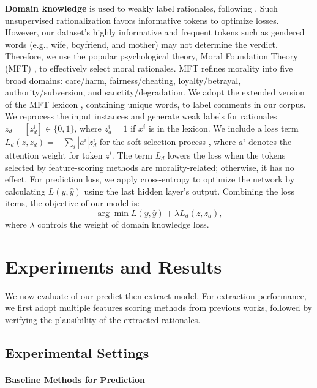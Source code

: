 \documentclass[letterpaper]{article} %
\begin{document}
\textbf{Domain knowledge} is used to weakly label rationales, following \citep{jiang-2021-structurizing}. 
Such unsupervised rationalization favors informative tokens to optimize losses. 
However, our dataset's highly informative and frequent tokens such as gendered words (e.g., wife, boyfriend, and mother) may not determine the verdict.
Therefore, we use the popular \cite{nguyen-2022-mapping, ziems-2022-moral} psychological theory, Moral Foundation Theory (MFT) \cite{haidt-2007-mft}, to effectively select moral rationales.
MFT refines morality into five broad domains: care/harm, fairness/cheating, loyalty/betrayal, authority/subversion, and sanctity/degradation.
We adopt the extended version of the MFT lexicon \cite{Hopp2020TheEM}, containing  unique words, to label comments in our corpus.
We reprocess the input instances and generate weak labels for rationales $z_{d}=[z_{d}^{i}]\in\{0,1\}$, where $z^{i}_{d}=1$ if $x^{i}$ is in the lexicon.
We include a loss term $L_{d}(z, z_{d})=-\sum_{i}|a^i|z^i_d$ for the soft selection process \cite{jiang-2021-structurizing}, where $a^i$ denotes the attention weight for token $z^{i}$. 
The term $L_{d}$ lowers the loss when the tokens selected by feature-scoring methods are morality-related; otherwise, it has no effect.
For prediction loss, we apply cross-entropy to optimize the network by calculating $L(y, \widehat{y})$ using the last hidden layer's output.
Combining the loss items, the objective of our model is:
\begin{equation}
    \arg \min L(y, \widehat{y})+\lambda L_{d}(z, z_{d}),
\end{equation}
where $\lambda$ controls the weight of domain knowledge loss.

\section{Experiments and Results}

We now evaluate of our predict-then-extract model.
For extraction performance, we first adopt multiple features scoring methods from previous works, followed by verifying the plausibility of the extracted rationales.

\subsection{Experimental Settings}
\label{sec:exp_settings}

\paragraph{Baseline Methods for Prediction}
\end{document}
